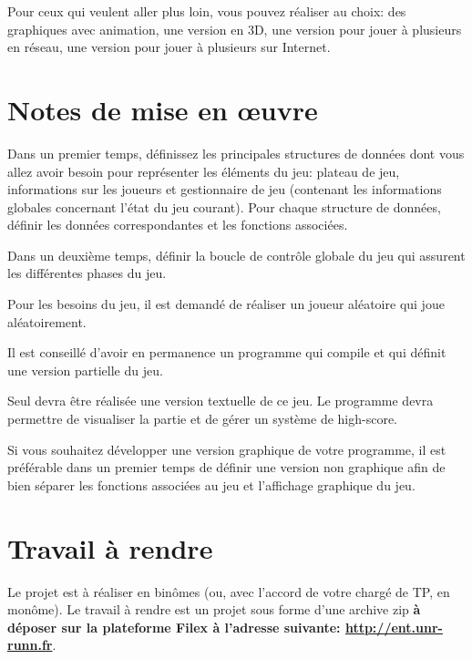 \documentclass[10pt]{article}
\begin{document}
Pour ceux qui veulent aller plus loin, vous pouvez réaliser au choix: des graphiques avec animation, une version en 3D, une version pour jouer à plusieurs en réseau, une version pour jouer à plusieurs sur Internet.

\section{Notes de mise en {\oe}uvre}

Dans un premier temps, définissez les principales structures de données dont vous allez avoir besoin pour représenter les éléments du jeu: plateau de jeu, informations sur les joueurs et gestionnaire de jeu (contenant les informations globales concernant l'état du jeu courant). Pour chaque structure de données, définir les données correspondantes et les fonctions associées.

Dans un deuxième temps, définir la boucle de contrôle globale du jeu qui assurent les différentes phases du jeu.

Pour les besoins du jeu, il est demandé de réaliser un joueur aléatoire qui joue aléatoirement.

Il est conseillé d'avoir en permanence un programme qui compile et qui définit une version partielle du jeu.

Seul devra être réalisée une version textuelle de ce jeu. Le programme devra permettre de visualiser la partie et de gérer un système de high-score.

Si vous souhaitez développer une version graphique de votre programme, il est préférable dans un premier temps de définir une version non graphique afin de bien séparer les fonctions associées au jeu et l'affichage graphique du jeu.

\section{Travail à rendre}
Le projet est à réaliser en binômes (ou, avec l'accord de votre chargé de TP, en monôme). Le travail à rendre est un projet sous forme d'une archive zip {\bf à déposer sur la plateforme Filex à l'adresse suivante: \url{http://ent.unr-runn.fr}}. 
\end{document}
